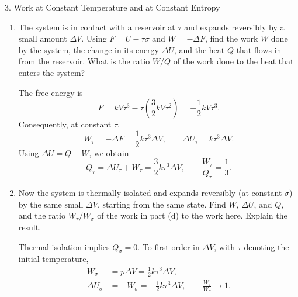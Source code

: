\documentclass[11pt]{article}
\begin{document}
\begin{problem}{3. Work at Constant Temperature and at Constant Entropy}
\begin{enumerate}[label=(\alph*)]
\begin{answer}
\begin{equation}
\end{equation}
Setting \(d\sigma=0\) yields
\begin{equation}
\label{eq:p3-pressure-result}
\left(\frac{\partial U}{\partial V}\right)_\sigma=-\frac{U}{2V},
\qquad p=\frac{U}{2V}=\boxed{\frac12k\tau^3}.
\end{equation}
\end{answer}
\item The system is in contact with a reservoir at \(\tau\) and expands reversibly by a small amount \(\Delta V\).
  Using \(F=U-\tau\sigma\) and \(W=-\Delta F\), find the work \(W\) done by the system, the change in its energy \(\Delta U\), and the heat \(Q\) that flows in from the reservoir.
  What is the ratio \(W/Q\) of the work done to the heat that enters the system?
  \begin{answer}
The free energy is
\begin{equation}
\label{eq:p3-free-energy}
F=kV\tau^3-\tau\left(\frac32kV\tau^2\right)=-\frac12kV\tau^3.
\end{equation}
Consequently, at constant \(\tau\),
\begin{equation}
\label{eq:p3-isothermal-work}
W_\tau=-\Delta F=\frac12k\tau^3\Delta V,
\qquad \Delta U_\tau=k\tau^3\Delta V.
\end{equation}
Using \(\Delta U=Q-W\), we obtain
\begin{equation}
\label{eq:p3-isothermal-heat}
Q_\tau=\Delta U_\tau+W_\tau=\frac32k\tau^3\Delta V,
\qquad \boxed{\frac{W_\tau}{Q_\tau}=\frac13}.
\end{equation}
\end{answer}
\item Now the system is thermally isolated and expands reversibly (at constant \(\sigma\)) by the same small \(\Delta V\), starting from the same state.
  Find \(W\), \(\Delta U\), and \(Q\), and the ratio \(W_\tau/W_\sigma\) of the work in part (d) to the work here.
  Explain the result.
  \begin{answer}
Thermal isolation implies \(Q_\sigma=0\). To first order in \(\Delta V\), with \(\tau\) denoting the initial temperature,
\begin{equation}
\label{eq:p3-isentropic-work-small}
\begin{aligned}
W_\sigma&=p\Delta V=\frac12k\tau^3\Delta V,\\
\Delta U_\sigma&=-W_\sigma=-\frac12k\tau^3\Delta V,\qquad \frac{W_\tau}{W_\sigma}\longrightarrow1.
\end{aligned}
\end{equation}

\end{answer}
\end{enumerate}
\end{problem}
\end{document}
